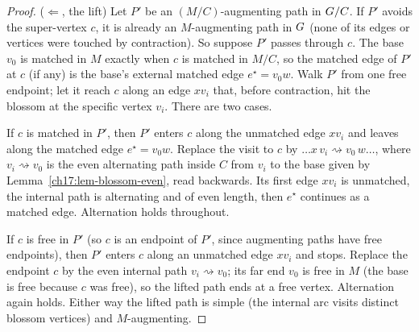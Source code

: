 \begin{proof}
($\Leftarrow$, the lift) Let $P'$ be an $(M/C)$-augmenting path in $G/C$. If $P'$ avoids the
super-vertex $c$, it is already an $M$-augmenting path in $G$ (none of its edges or vertices were
touched by contraction). So suppose $P'$ passes through $c$. The base $v_0$ is matched in $M$ exactly
when $c$ is matched in $M/C$, so the matched edge of $P'$ at $c$ (if any) is the base's external
matched edge $e^{\star}=v_0 w$. Walk $P'$ from one free endpoint; let it reach $c$ along an edge
$x v_i$ that, before contraction, hit the blossom at the specific vertex $v_i$. There are two cases.

If $c$ is matched in $P'$, then $P'$ enters $c$ along the unmatched edge $xv_i$ and leaves along the
matched edge $e^{\star}=v_0 w$. Replace the visit to $c$ by $\dots x\,v_i \rightsquigarrow v_0\, w
\dots$, where $v_i \rightsquigarrow v_0$ is the even alternating path inside $C$ from $v_i$ to the base
given by Lemma~\ref{ch17:lem-blossom-even}, read backwards. Its first edge $x v_i$ is unmatched, the
internal path is alternating and of even length, then $e^{\star}$ continues as a matched edge.
Alternation holds throughout.

If $c$ is free in $P'$ (so $c$ is an endpoint of $P'$, since augmenting paths have free endpoints),
then $P'$ enters $c$ along an unmatched edge $x v_i$ and stops. Replace the endpoint $c$ by the even
internal path $v_i \rightsquigarrow v_0$; its far end $v_0$ is free in $M$ (the base is free because
$c$ was free), so the lifted path ends at a free vertex. Alternation again holds. Either way the
lifted path is simple (the internal arc visits distinct blossom vertices) and $M$-augmenting.


\end{proof}
